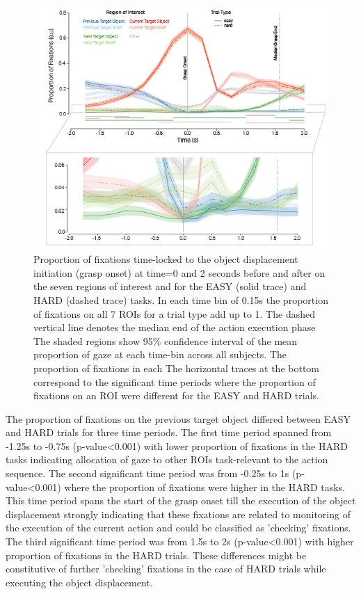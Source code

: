 \begin{figure}[t]
    \centering
    \includegraphics[width=1.\linewidth]{source/figures/results/results_22.png}
    \caption[Time course of fixations]{Proportion of fixations time-locked to the object displacement initiation (grasp onset) at time=0 and 2 seconds before and after on the seven regions of interest and for the EASY (solid trace) and HARD (dashed trace) tasks. In each time bin of 0.15s the proportion of fixations on all 7 ROIs for a trial type add up to 1. The dashed vertical line denotes the median end of the action execution phase The shaded regions show 95\% confidence interval of the mean proportion of gaze at each time-bin across all subjects. The proportion of fixations in each The horizontal traces at the bottom correspond to the significant time periods where the proportion of fixations on an ROI were different for the EASY and HARD trials.}
    \label{figure:action_locked}
\end{figure}


The proportion of fixations on the previous target object differed between EASY and HARD trials for three time periods. The first time period spanned from -1.25s to -0.75s (p-value<0.001) with lower proportion of fixations in the HARD tasks indicating allocation of gaze to other ROIs task-relevant to the action sequence. The second significant time period was from -0.25s to 1s (p-value<0.001) where the proportion of fixations were higher in the HARD tasks. This time period spans the start of the grasp onset till the execution of the object displacement strongly indicating that these fixations are related to monitoring of the execution of the current action and could be classified as 'checking' fixations. The third significant time period was from 1.5s to 2s (p-value<0.001) with higher proportion of fixations in the HARD trials. These differences might be constitutive of further 'checking' fixations in the case of HARD trials while executing the object displacement. 

